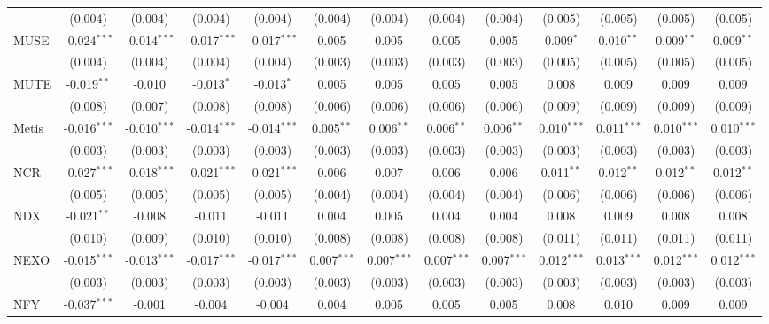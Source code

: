 \begin{table}[!htbp]
\begin{tabular}{@{\extracolsep{5pt}}lcccccccccccc}
  & (0.004) & (0.004) & (0.004) & (0.004) & (0.004) & (0.004) & (0.004) & (0.004) & (0.005) & (0.005) & (0.005) & (0.005) \\
 MUSE & -0.024$^{***}$ & -0.014$^{***}$ & -0.017$^{***}$ & -0.017$^{***}$ & 0.005$^{}$ & 0.005$^{}$ & 0.005$^{}$ & 0.005$^{}$ & 0.009$^{*}$ & 0.010$^{**}$ & 0.009$^{**}$ & 0.009$^{**}$ \\
  & (0.004) & (0.004) & (0.004) & (0.004) & (0.003) & (0.003) & (0.003) & (0.003) & (0.005) & (0.005) & (0.005) & (0.005) \\
 MUTE & -0.019$^{**}$ & -0.010$^{}$ & -0.013$^{*}$ & -0.013$^{*}$ & 0.005$^{}$ & 0.005$^{}$ & 0.005$^{}$ & 0.005$^{}$ & 0.008$^{}$ & 0.009$^{}$ & 0.009$^{}$ & 0.009$^{}$ \\
  & (0.008) & (0.007) & (0.008) & (0.008) & (0.006) & (0.006) & (0.006) & (0.006) & (0.009) & (0.009) & (0.009) & (0.009) \\
 Metis & -0.016$^{***}$ & -0.010$^{***}$ & -0.014$^{***}$ & -0.014$^{***}$ & 0.005$^{**}$ & 0.006$^{**}$ & 0.006$^{**}$ & 0.006$^{**}$ & 0.010$^{***}$ & 0.011$^{***}$ & 0.010$^{***}$ & 0.010$^{***}$ \\
  & (0.003) & (0.003) & (0.003) & (0.003) & (0.003) & (0.003) & (0.003) & (0.003) & (0.003) & (0.003) & (0.003) & (0.003) \\
 NCR & -0.027$^{***}$ & -0.018$^{***}$ & -0.021$^{***}$ & -0.021$^{***}$ & 0.006$^{}$ & 0.007$^{}$ & 0.006$^{}$ & 0.006$^{}$ & 0.011$^{**}$ & 0.012$^{**}$ & 0.012$^{**}$ & 0.012$^{**}$ \\
  & (0.005) & (0.005) & (0.005) & (0.005) & (0.004) & (0.004) & (0.004) & (0.004) & (0.006) & (0.006) & (0.006) & (0.006) \\
 NDX & -0.021$^{**}$ & -0.008$^{}$ & -0.011$^{}$ & -0.011$^{}$ & 0.004$^{}$ & 0.005$^{}$ & 0.004$^{}$ & 0.004$^{}$ & 0.008$^{}$ & 0.009$^{}$ & 0.008$^{}$ & 0.008$^{}$ \\
  & (0.010) & (0.009) & (0.010) & (0.010) & (0.008) & (0.008) & (0.008) & (0.008) & (0.011) & (0.011) & (0.011) & (0.011) \\
 NEXO & -0.015$^{***}$ & -0.013$^{***}$ & -0.017$^{***}$ & -0.017$^{***}$ & 0.007$^{***}$ & 0.007$^{***}$ & 0.007$^{***}$ & 0.007$^{***}$ & 0.012$^{***}$ & 0.013$^{***}$ & 0.012$^{***}$ & 0.012$^{***}$ \\
  & (0.003) & (0.003) & (0.003) & (0.003) & (0.003) & (0.003) & (0.003) & (0.003) & (0.003) & (0.003) & (0.003) & (0.003) \\
 NFY & -0.037$^{***}$ & -0.001$^{}$ & -0.004$^{}$ & -0.004$^{}$ & 0.004$^{}$ & 0.005$^{}$ & 0.005$^{}$ & 0.005$^{}$ & 0.008$^{}$ & 0.010$^{}$ & 0.009$^{}$ & 0.009$^{}$ \\

\end{tabular}
\end{table}
